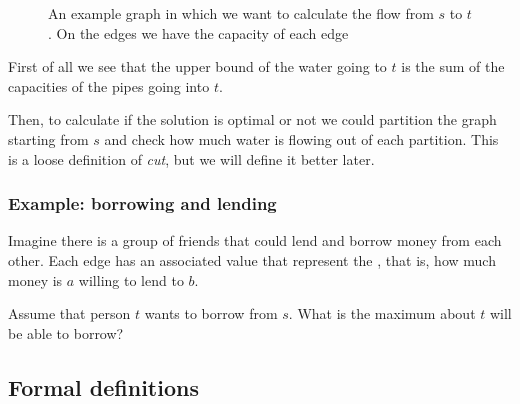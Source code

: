 \documentclass[12pt]{extarticle}
\begin{document}
\begin{figure}[H]
    \centering
    \caption{An example graph in which we want to calculate the flow from $s$ to $t$. On the edges we have the capacity of each edge}
    \label{fig:flow}
\end{figure}

First of all we see that the upper bound of the water going to $t$ is the sum of the capacities of the pipes going into $t$.

Then, to calculate if the solution is optimal or not we could partition the graph starting from $s$ and check how much water is flowing out of each partition.
This is a loose definition of \emph{cut}, but we will define it better later.

\subsubsection{Example: borrowing and lending}

Imagine there is a group of friends that could lend and borrow money from each other.
Each edge has an associated value that represent the , that is, how much money is $a$ willing to lend to $b$.

Assume that person $t$ wants to borrow from $s$. What is the maximum about $t$ will be able to borrow?

\subsection{Formal definitions}
\end{document}
